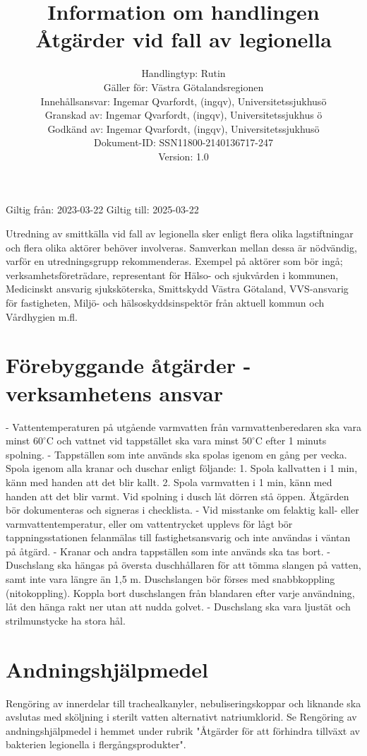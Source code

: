 \title{
Information om handlingen
}
\author{
Handlingtyp: Rutin \\ Gäller för: Västra Götalandsregionen \\ Innehållsansvar: Ingemar Qvarfordt, (ingqv), Universitetssjukhusö \\ Granskad av: Ingemar Qvarfordt, (ingqv), Universitetssjukhus ö \\ Godkänd av: Ingemar Qvarfordt, (ingqv), Universitetssjukhusö \\ Dokument-ID: SSN11800-2140136717-247 \\ Version: 1.0
}
Giltig från: 2023-03-22
Giltig till: 2025-03-22

\title{
Åtgärder vid fall av legionella
}
Utredning av smittkälla vid fall av legionella sker enligt flera olika lagstiftningar och flera olika aktörer behöver involveras. Samverkan mellan dessa är nödvändig, varför en utredningsgrupp rekommenderas. Exempel på aktörer som bör ingå; verksamhetsföreträdare, representant för Hälso- och sjukvården i kommunen, Medicinskt ansvarig sjuksköterska, Smittskydd Västra Götaland, VVS-ansvarig för fastigheten, Miljö- och hälsoskyddsinspektör från aktuell kommun och Vårdhygien m.fl.
\section*{Förebyggande åtgärder - verksamhetens ansvar}
- Vattentemperaturen på utgående varmvatten från varmvattenberedaren ska vara minst \(60^{\circ} \mathrm{C}\) och vattnet vid tappstället ska vara minst \(50^{\circ} \mathrm{C}\) efter 1 minuts spolning.
- Tappställen som inte används ska spolas igenom en gång per vecka. Spola igenom alla kranar och duschar enligt följande:
1. Spola kallvatten i 1 min, känn med handen att det blir kallt.
2. Spola varmvatten i 1 min, känn med handen att det blir varmt.
Vid spolning i dusch låt dörren stå öppen. Ätgärden bör dokumenteras och signeras i checklista.
- Vid misstanke om felaktig kall- eller varmvattentemperatur, eller om vattentrycket upplevs för lågt bör tappningsstationen felanmälas till fastighetsansvarig och inte användas i väntan på åtgärd.
- Kranar och andra tappställen som inte används ska tas bort.
- Duschslang ska hängas på översta duschhållaren för att tömma slangen på vatten, samt inte vara längre än 1,5 m. Duschslangen bör förses med snabbkoppling (nitokoppling). Koppla bort duschslangen från blandaren efter varje användning, låt den hänga rakt ner utan att nudda golvet.
- Duschslang ska vara ljustät och strilmunstycke ha stora hål.
\section*{Andningshjälpmedel}
Rengöring av innerdelar till trachealkanyler, nebuliseringskoppar och liknande ska avslutas med sköljning i sterilt vatten alternativt natriumklorid. Se Rengöring av andningshjälpmedel i hemmet under rubrik "Åtgärder för att förhindra tillväxt av bakterien legionella i flergångsprodukter".
